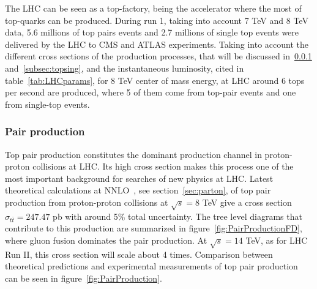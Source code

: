 The LHC can be seen as a top-factory, being the accelerator where the most of top-quarks can be produced. During run 1, taking into account 7 TeV and 8 TeV data, 5.6 millions of top pairs events and 2.7 millions of single top events were delivered by the LHC to CMS and ATLAS experiments. Taking into account the different cross sections of the production processes, that will be discussed in~\ref{subsec:toppair} and~\ref{subsec:topsing}, and the instantaneous luminosity, cited in table~\ref{tab:LHCparams}, for 8 TeV center of mass energy, at LHC around 6 tops per second are produced, where 5 of them come from top-pair events and one from single-top events.  

\subsubsection{Pair production}
\label{subsec:toppair}

Top pair production constitutes the dominant production channel in proton-proton collisions at LHC. Its high cross section makes this process one of the most important background for searches of new physics at LHC. Latest theoretical calculations at NNLO~\cite{Czakon:2013goa}, see section~\ref{sec:parton}, of top pair production from proton-proton collisions at $\sqrt{s}=8$ TeV give a cross section $\sigma_{t\bar{t}}=247.47$ pb with around 5\% total uncertainty. The tree level diagrams that contribute to this production are summarized in figure~\ref{fig:PairProductionFD}, where gluon fusion dominates the pair production. At $\sqrt{s}=14$ TeV, as for LHC Run II, this cross section will scale about 4 times. Comparison between theoretical predictions and experimental measurements of top pair production can be seen in figure~\ref{fig:PairProduction}.

